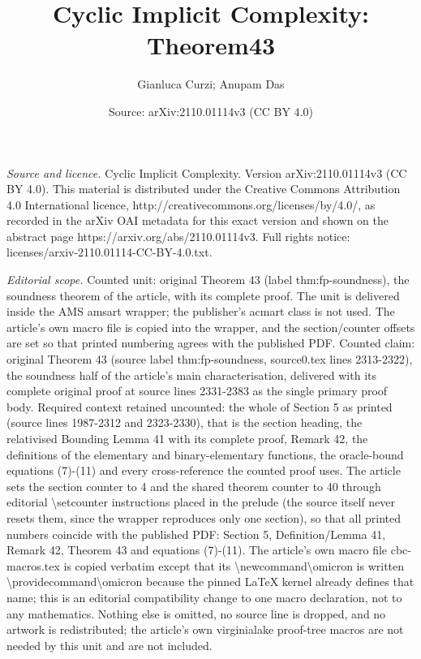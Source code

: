 \documentclass[10pt,a4paper]{amsart}
\title[Soundness of the relativised safe-recursion function algebra]{Cyclic Implicit Complexity: Theorem43}
\author{Gianluca Curzi; Anupam Das}
\date{Source: arXiv:2110.01114v3 (CC BY 4.0)}
\theoremstyle{definition}
\theoremstyle{remark}
\begin{document}
\maketitle
\noindent\emph{Source and licence.} Cyclic Implicit Complexity. Version arXiv:2110.01114v3 (CC BY 4.0). This material is distributed under the Creative Commons Attribution 4.0 International licence, http://creativecommons.org/licenses/by/4.0/, as recorded in the arXiv OAI metadata for this exact version and shown on the abstract page https://arxiv.org/abs/2110.01114v3. Full rights notice: licenses/arxiv-2110.01114-CC-BY-4.0.txt.\par\smallskip
\noindent\textit{Editorial scope.} Counted unit: original Theorem 43 (label thm:fp-soundness), the soundness theorem of the article, with its complete proof. The unit is delivered inside the AMS amsart wrapper; the publisher's acmart class is not used. The article's own macro file is copied into the wrapper, and the section/counter offsets are set so that printed numbering agrees with the published PDF. Counted claim: original Theorem 43 (source label thm:fp-soundness, source0.tex lines 2313-2322), the soundness half of the article's main characterisation, delivered with its complete original proof at source lines 2331-2383 as the single primary proof body. Required context retained uncounted: the whole of Section 5 as printed (source lines 1987-2312 and 2323-2330), that is the section heading, the relativised Bounding Lemma 41 with its complete proof, Remark 42, the definitions of the elementary and binary-elementary functions, the oracle-bound equations (7)-(11) and every cross-reference the counted proof uses. The article sets the section counter to 4 and the shared theorem counter to 40 through editorial \textbackslash{}setcounter instructions placed in the prelude (the source itself never resets them, since the wrapper reproduces only one section), so that all printed numbers coincide with the published PDF: Section 5, Definition/Lemma 41, Remark 42, Theorem 43 and equations (7)-(11). The article's own macro file cbc-macros.tex is copied verbatim except that its \textbackslash{}newcommand\textbackslash{}omicron is written \textbackslash{}providecommand\textbackslash{}omicron because the pinned LaTeX kernel already defines that name; this is an editorial compatibility change to one macro declaration, not to any mathematics. Nothing else is omitted, no source line is dropped, and no artwork is redistributed; the article's own virginialake proof-tree macros are not needed by this unit and are not included.
\end{document}
